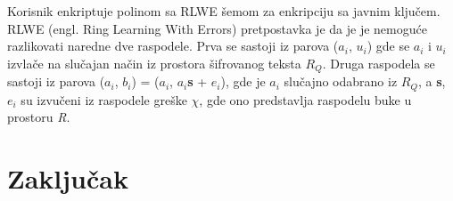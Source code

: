 \documentclass[a4paper]{article}
\begin{document}
Korisnik enkriptuje polinom sa RLWE šemom za enkripciju sa javnim ključem. 
RLWE (engl. Ring Learning With Errors) pretpostavka je da je je nemoguće razlikovati naredne dve raspodele. Prva se sastoji iz parova ($a_i$, $u_i$) gde se $a_i$ i $u_i$ izvlače na slučajan način iz prostora šifrovanog teksta $R_Q$. Druga raspodela se sastoji iz parova ($a_i$, $b_i$) = ($a_i$, $a_i$\textbf{s} + $e_i$), gde je $a_i$ slučajno odabrano iz $R_Q$, a \textbf{s}, $e_i$ su izvučeni iz raspodele greške $\chi$, gde ono predstavlja raspodelu buke u prostoru \textit{R}.
\section{Zaključak}
\label{sec:zakljucak}


\appendix
 

\end{document}
